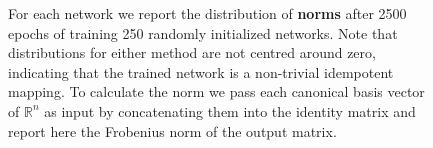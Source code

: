 \documentclass{article}
\theoremstyle{plain}
\theoremstyle{definition}
\theoremstyle{remark}
\begin{document}
\begin{figure}[H]
    \centering
    \caption{For each network we report the distribution of \textbf{norms} after 2500 epochs of training 250 randomly initialized networks. Note that distributions for either method are not centred around zero, indicating that the trained network is a non-trivial idempotent mapping. To calculate the norm we pass each canonical basis vector of $\mathbb{R}^n$ as input by concatenating them into the identity matrix and report here the Frobenius norm of the output matrix.}
    \label{fig:norm-test-nets}
\end{figure}

\newpage
\end{document}
